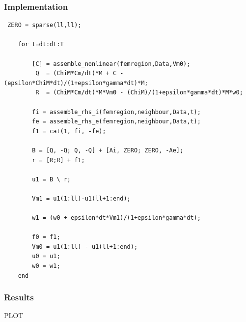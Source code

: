 \documentclass[a4paper,12pt]{article}
\begin{document}
\subsubsection{Implementation}
\begin{verbatim}
 ZERO = sparse(ll,ll);
        
    for t=dt:dt:T
        
        [C] = assemble_nonlinear(femregion,Data,Vm0);
         Q  = (ChiM*Cm/dt)*M + C - (epsilon*ChiM*dt)/(1+epsilon*gamma*dt)*M;
         R  = (ChiM*Cm/dt)*M*Vm0 - (ChiM)/(1+epsilon*gamma*dt)*M*w0;
    
        fi = assemble_rhs_i(femregion,neighbour,Data,t);
        fe = assemble_rhs_e(femregion,neighbour,Data,t);
        f1 = cat(1, fi, -fe);
    
        B = [Q, -Q; Q, -Q] + [Ai, ZERO; ZERO, -Ae];
        r = [R;R] + f1;
        
        u1 = B \ r; 
        
        Vm1 = u1(1:ll)-u1(ll+1:end);

        w1 = (w0 + epsilon*dt*Vm1)/(1+epsilon*gamma*dt);
    
        f0 = f1;
        Vm0 = u1(1:ll) - u1(ll+1:end);
        u0 = u1;
        w0 = w1;
    end
\end{verbatim}
\subsubsection{Results}
PLOT
\end{document}
